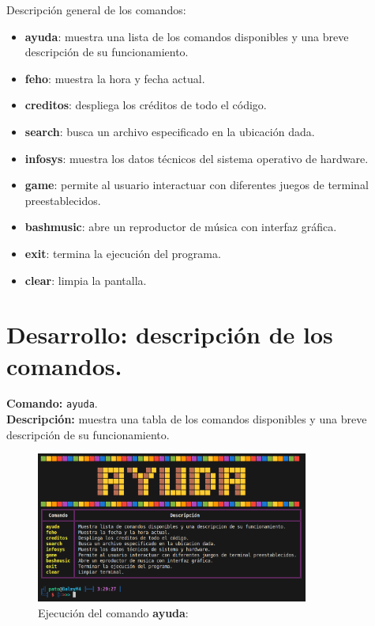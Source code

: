 \documentclass[titlepage]{article}
\begin{document}
Descripción general de los comandos:
\begin{itemize}
\item \textbf{ayuda}: muestra una lista de los comandos disponibles y una breve descripción de su funcionamiento.                        
\item \textbf{feho}: muestra la hora y fecha actual.
\item \textbf{creditos}: despliega los créditos de todo el código. 
\item \textbf{search}: busca un archivo especificado en la ubicación dada. 
\item \textbf{infosys}: muestra los datos técnicos del sistema operativo de hardware. 
\item \textbf{game}: permite al usuario interactuar con diferentes juegos de terminal preestablecidos.               
\item \textbf{bashmusic}: abre un reproductor de música con interfaz gráfica.           
\item \textbf{exit}: termina la ejecución del programa.     
\item \textbf{clear}: limpia la pantalla. 
\end{itemize}

\newpage
\section{Desarrollo: descripción de los comandos.}

\noindent
\textbf{Comando:} \verb|ayuda|. \\
\textbf{Descripción:} muestra una tabla de los comandos disponibles y una breve descripción de su funcionamiento.

\begin{figure}[H]
    \centering
    \includegraphics[width=0.8\textwidth]{ayuda.png}
    \caption{Ejecución del comando \textbf{ayuda}:}
    \label{fig:ejemplo}
\end{figure}
\end{document}
